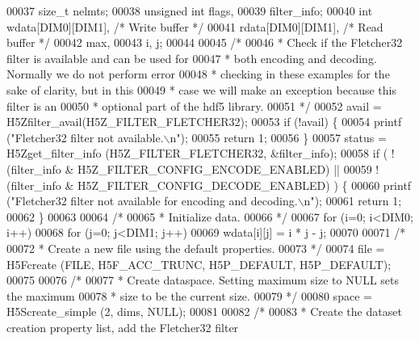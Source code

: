\begin{DoxyCode}
00037     \textcolor{keywordtype}{size\_t}          nelmts;
00038     \textcolor{keywordtype}{unsigned} \textcolor{keywordtype}{int}    flags,
00039                     filter\_info;
00040     \textcolor{keywordtype}{int}             wdata[DIM0][DIM1],          \textcolor{comment}{/* Write buffer */}
00041                     rdata[DIM0][DIM1],          \textcolor{comment}{/* Read buffer */}
00042                     max,
00043                     i, j;
00044 
00045     \textcolor{comment}{/*}
00046 \textcolor{comment}{     * Check if the Fletcher32 filter is available and can be used for}
00047 \textcolor{comment}{     * both encoding and decoding.  Normally we do not perform error}
00048 \textcolor{comment}{     * checking in these examples for the sake of clarity, but in this}
00049 \textcolor{comment}{     * case we will make an exception because this filter is an}
00050 \textcolor{comment}{     * optional part of the hdf5 library.}
00051 \textcolor{comment}{     */}
00052     avail = H5Zfilter\_avail(H5Z\_FILTER\_FLETCHER32);
00053     \textcolor{keywordflow}{if} (!avail) \{
00054         printf (\textcolor{stringliteral}{"Fletcher32 filter not available.\(\backslash\)n"});
00055         \textcolor{keywordflow}{return} 1;
00056     \}
00057     status = H5Zget\_filter\_info (H5Z\_FILTER\_FLETCHER32, &filter\_info);
00058     \textcolor{keywordflow}{if} ( !(filter\_info & H5Z\_FILTER\_CONFIG\_ENCODE\_ENABLED) ||
00059                 !(filter\_info & H5Z\_FILTER\_CONFIG\_DECODE\_ENABLED) ) \{
00060         printf (\textcolor{stringliteral}{"Fletcher32 filter not available for encoding and decoding.\(\backslash\)n"});
00061         \textcolor{keywordflow}{return} 1;
00062     \}
00063 
00064     \textcolor{comment}{/*}
00065 \textcolor{comment}{     * Initialize data.}
00066 \textcolor{comment}{     */}
00067     \textcolor{keywordflow}{for} (i=0; i<DIM0; i++)
00068         \textcolor{keywordflow}{for} (j=0; j<DIM1; j++)
00069             wdata[i][j] = i * j - j;
00070 
00071     \textcolor{comment}{/*}
00072 \textcolor{comment}{     * Create a new file using the default properties.}
00073 \textcolor{comment}{     */}
00074     file = H5Fcreate (FILE, H5F\_ACC\_TRUNC, H5P\_DEFAULT, H5P\_DEFAULT);
00075 
00076     \textcolor{comment}{/*}
00077 \textcolor{comment}{     * Create dataspace.  Setting maximum size to NULL sets the maximum}
00078 \textcolor{comment}{     * size to be the current size.}
00079 \textcolor{comment}{     */}
00080     space = H5Screate\_simple (2, dims, NULL);
00081 
00082     \textcolor{comment}{/*}
00083 \textcolor{comment}{     * Create the dataset creation property list, add the Fletcher32 filter}

\end{DoxyCode}
